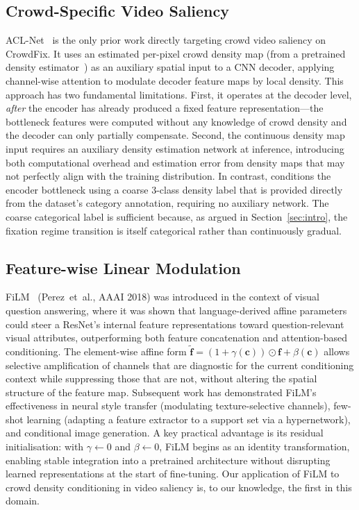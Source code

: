\documentclass[twocolumn]{article}
\begin{document}
\subsection{Crowd-Specific Video Saliency}

ACL-Net~\citep{aclnet} is the only prior work directly targeting crowd
video saliency on CrowdFix.  It uses an estimated per-pixel crowd density
map (from a pretrained density estimator~\citep{zhang2016}) as an auxiliary
spatial input to a CNN decoder, applying channel-wise attention to modulate
decoder feature maps by local density.  This approach has two fundamental
limitations.  First, it operates at the decoder level, \emph{after} the
encoder has already produced a fixed feature representation---the bottleneck
features were computed without any knowledge of crowd density and the decoder
can only partially compensate.  Second, the continuous density map input
requires an auxiliary density estimation network at inference, introducing
both computational overhead and estimation error from density maps that may
not perfectly align with the training distribution.  In contrast, \ourmodel{}
conditions the encoder bottleneck using a coarse 3-class density label that
is provided directly from the dataset's category annotation, requiring no
auxiliary network.  The coarse categorical label is sufficient because, as
argued in Section~\ref{sec:intro}, the fixation regime transition is itself
categorical rather than continuously gradual.

\subsection{Feature-wise Linear Modulation}

FiLM~\citep{film} (Perez~et~al., AAAI 2018) was introduced in the context
of visual question answering, where it was shown that language-derived affine
parameters could steer a ResNet's internal feature representations toward
question-relevant visual attributes, outperforming both feature concatenation
and attention-based conditioning.  The element-wise affine form
$\tilde{\mathbf{f}} = (1+\gamma(\mathbf{c})) \odot \mathbf{f} + \beta(\mathbf{c})$
allows selective amplification of channels that are diagnostic for the
current conditioning context while suppressing those that are not, without
altering the spatial structure of the feature map.  Subsequent work has
demonstrated FiLM's effectiveness in neural style transfer (modulating
texture-selective channels), few-shot learning (adapting a feature extractor
to a support set via a hypernetwork), and conditional image generation.
A key practical advantage is its residual initialisation: with
$\gamma\!\leftarrow\!0$ and $\beta\!\leftarrow\!0$, FiLM begins as an
identity transformation, enabling stable integration into a pretrained
architecture without disrupting learned representations at the start of
fine-tuning.  Our application of FiLM to crowd density conditioning in video
saliency is, to our knowledge, the first in this domain.
\end{document}
